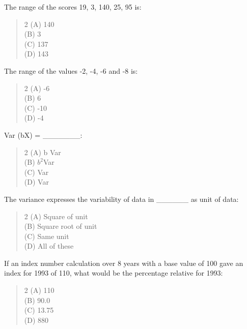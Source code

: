 \documentclass[11pt,a4paper]{article}
\begin{document}
\begin{mcqlist}
\item The range of the scores 19, 3, 140, 25, 95 is:
\begin{quote}\begin{multicols}{2}
\noindent (A) 140 \\
(B) 3 \\
(C) 137 \\
(D) 143
\end{multicols}\end{quote}

\item The range of the values -2, -4, -6 and -8 is:
\begin{quote}\begin{multicols}{2}
\noindent (A) -6 \\
(B) 6 \\
(C) -10 \\
(D) -4
\end{multicols}\end{quote}

\item Var (bX) = \_\_\_\_\_\_\_:
\begin{quote}\begin{multicols}{2}
\noindent (A) b Var \\
(B) $b^2$Var \\
(C) Var \\
(D) Var
\end{multicols}\end{quote}

\item The variance expresses the variability of data in \_\_\_\_\_\_ as unit of data:
\begin{quote}\begin{multicols}{2}
\noindent (A) Square of unit \\
(B) Square root of unit \\
(C) Same unit \\
(D) All of these
\end{multicols}\end{quote}

\item If an index number calculation over 8 years with a base value of 100 gave an index for 1993 of 110, what would be the percentage relative for 1993:
\begin{quote}\begin{multicols}{2}
\noindent (A) 110 \\
(B) 90.0 \\
(C) 13.75 \\
(D) 880
\end{multicols}\end{quote}


\end{mcqlist}
\end{document}
